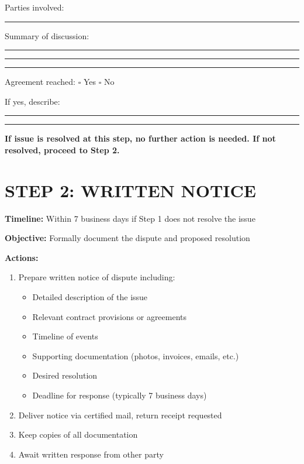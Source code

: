 \documentclass[11pt,letterpaper]{article}
\begin{document}
Parties involved: \rule{8cm}{0.4pt}

Summary of discussion:

\rule{14cm}{0.4pt}

\rule{14cm}{0.4pt}

\rule{14cm}{0.4pt}

Agreement reached: $\square$ Yes $\square$ No

If yes, describe: \rule{9cm}{0.4pt}

\rule{14cm}{0.4pt}

\vspace{6pt}

\textbf{If issue is resolved at this step, no further action is needed. If not resolved, proceed to Step 2.}

\newpage

\section*{STEP 2: WRITTEN NOTICE}

\textbf{Timeline:} Within 7 business days if Step 1 does not resolve the issue

\textbf{Objective:} Formally document the dispute and proposed resolution

\vspace{6pt}

\textbf{Actions:}

\begin{enumerate}
\item Prepare written notice of dispute including:
   \begin{itemize}
   \item Detailed description of the issue
   \item Relevant contract provisions or agreements
   \item Timeline of events
   \item Supporting documentation (photos, invoices, emails, etc.)
   \item Desired resolution
   \item Deadline for response (typically 7 business days)
   \end{itemize}
\item Deliver notice via certified mail, return receipt requested
\item Keep copies of all documentation
\item Await written response from other party
\end{enumerate}
\end{document}
